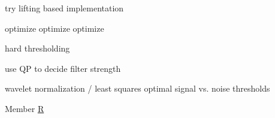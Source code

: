 \begin{DoxyRefList}
\label{todo__todo000028}%
%
try lifting based implementation 

\label{todo__todo000029}%
%
optimize optimize optimize 

\label{todo__todo000030}%
%
hard thresholding 

\label{todo__todo000031}%
%
use QP to decide filter strength 

\label{todo__todo000032}%
%
wavelet normalization / least squares optimal signal vs. noise thresholds  
\item[Member \mbox{\hyperlink{vf__selectivecolor_8c_a5c71a5e59a53413cd6c270266d63b031}{R}} ]\label{todo__todo000033}%
%


\end{DoxyRefList}
